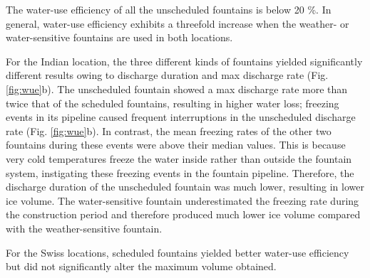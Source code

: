 The water-use efficiency of all the unscheduled fountains is below 20 \%. In general, water-use efficiency
exhibits a threefold increase when the weather- or water-sensitive fountains are used in both
locations.  

For the Indian location, the three different kinds of fountains yielded significantly different results owing to discharge
duration and max discharge rate
(Fig. \ref{fig:wue}b). The unscheduled fountain showed a max discharge rate more than twice that of
the scheduled fountains, resulting in higher water loss; freezing events in its pipeline caused frequent
interruptions in the unscheduled discharge rate (Fig. \ref{fig:wue}b). In contrast, the mean freezing
rates of the other two fountains during these events were above their median values. This is because very cold
temperatures freeze the water inside rather than outside the fountain system, instigating these freezing events in
the fountain pipeline. Therefore, the discharge duration of the unscheduled fountain was much lower, resulting in
lower ice volume. The water-sensitive fountain underestimated the freezing rate during the construction period
and therefore produced much lower ice volume compared with the weather-sensitive fountain. 

For the Swiss locations, scheduled fountains yielded better water-use efficiency but did not significantly alter the maximum
volume obtained. 







